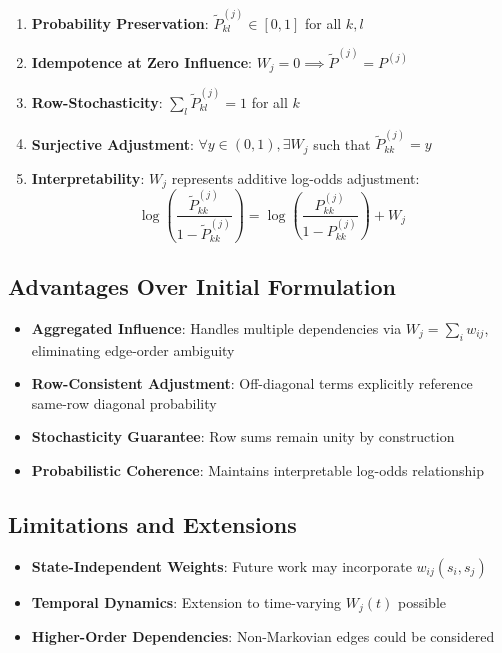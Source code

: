 \documentclass[answers,12pt,addpoints]{exam}
\begin{document}
\begin{enumerate}[label=(\roman*)]
    \item \textbf{Probability Preservation}: $\widetilde{P}^{(j)}_{kl} \in [0,1]$ for all $k,l$
    \item \textbf{Idempotence at Zero Influence}: $W_j = 0 \implies \widetilde{P}^{(j)} = P^{(j)}$
    \item \textbf{Row-Stochasticity}: $\sum_l \widetilde{P}^{(j)}_{kl} = 1$ for all $k$
    \item \textbf{Surjective Adjustment}: $\forall y \in (0,1), \exists W_j$ such that $\widetilde{P}^{(j)}_{kk} = y$
    \item \textbf{Interpretability}: $W_j$ represents additive log-odds adjustment:
    \[
    \log\left(\frac{\widetilde{P}^{(j)}_{kk}}{1-\widetilde{P}^{(j)}_{kk}}\right) = \log\left(\frac{P^{(j)}_{kk}}{1-P^{(j)}_{kk}}\right) + W_j
    \]
\end{enumerate}

\subsection*{Advantages Over Initial Formulation}

\begin{itemize}
    \item \textbf{Aggregated Influence}: Handles multiple dependencies via $W_j = \sum_{i} w_{ij}$, eliminating edge-order ambiguity
    \item \textbf{Row-Consistent Adjustment}: Off-diagonal terms explicitly reference same-row diagonal probability
    \item \textbf{Stochasticity Guarantee}: Row sums remain unity by construction
    \item \textbf{Probabilistic Coherence}: Maintains interpretable log-odds relationship
\end{itemize}

\subsection*{Limitations and Extensions}

\begin{itemize}
    \item \textbf{State-Independent Weights}: Future work may incorporate $w_{ij}(s_i,s_j)$
    \item \textbf{Temporal Dynamics}: Extension to time-varying $W_j(t)$ possible
    \item \textbf{Higher-Order Dependencies}: Non-Markovian edges could be considered
\end{itemize}
\end{document}

